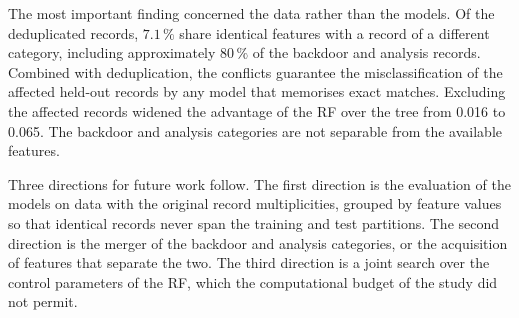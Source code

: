 The most important finding concerned the data rather than the models. Of the
deduplicated records, $7.1\,\%$ share identical features with a record of a
different category, including approximately $80\,\%$ of the backdoor and
analysis records. Combined with deduplication, the conflicts guarantee the
misclassification of the affected held-out records by any model that
memorises exact matches. Excluding the affected records widened the
advantage of the RF over the tree from 0.016 to 0.065. The backdoor and
analysis categories are not separable from the available features.

Three directions for future work follow. The first direction is the
evaluation of the models on data with the original record multiplicities,
grouped by feature values so that identical records never span the training
and test partitions. The second direction is the merger of the backdoor and
analysis categories, or the acquisition of features that separate the two.
The third direction is a joint search over the control parameters of the
RF, which the computational budget of the study did not permit.
